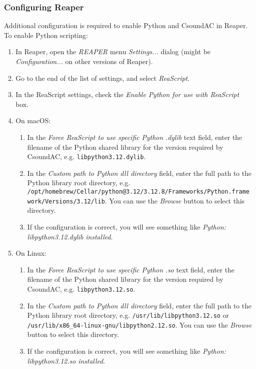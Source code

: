 \documentclass[letterpaper,10pt,DIV=12,parskip=half]{scrartcl}
\begin{document}
\subsubsection{Configuring Reaper}

Additional configuration is required to enable Python and CsoundAC in Reaper. To enable Python scripting:

\begin{enumerate}
\item In Reaper, open the \emph{REAPER} menu \emph{Settings...} dialog (might be \emph{Configuration...} on other versions of Reaper).
\item Go to the end of the list of settings, and select \emph{ReaScript}.
\item In the ReaScript settings, check the \emph{Enable Python for use with ReaScript} box.
\item On macOS:
\begin{enumerate}
\item In the \emph{Force ReaScript to use specific Python .dylib} text field, enter the filename of the Python shared library for the version required by CsoundAC, e.g. \lstinline|libpython3.12.dylib|. 
\item In the \emph{Custom path to Python dll directory} field, enter the full path to the Python library root directory, e.g. \lstinline|/opt/homebrew/Cellar/python@3.12/3.12.8/Frameworks/Python.framework/Versions/3.12/lib|. You can use the \emph{Browse} button to select this directory.
\item If the configuration is correct, you will see something like \emph{Python: libpython3.12.dylib installed}.
\end{enumerate}
\item On Linux:
\begin{enumerate}
\item In the \emph{Force ReaScript to use specific Python .so} text field, enter the filename of the Python shared library for the version required by CsoundAC, e.g. \lstinline|libpython3.12.so|. 
\item In the \emph{Custom path to Python dll directory} field, enter the full path to the Python library root directory, e.g. \lstinline|/usr/lib/libpython3.12.so| or \lstinline|/usr/lib/x86_64-linux-gnu/libpython2.12.so|. You can use the \emph{Browse} button to select this directory.
\item If the configuration is correct, you will see something like \emph{Python: libpython3.12.so installed}.
\end{enumerate}
\end{enumerate}
\end{document}
